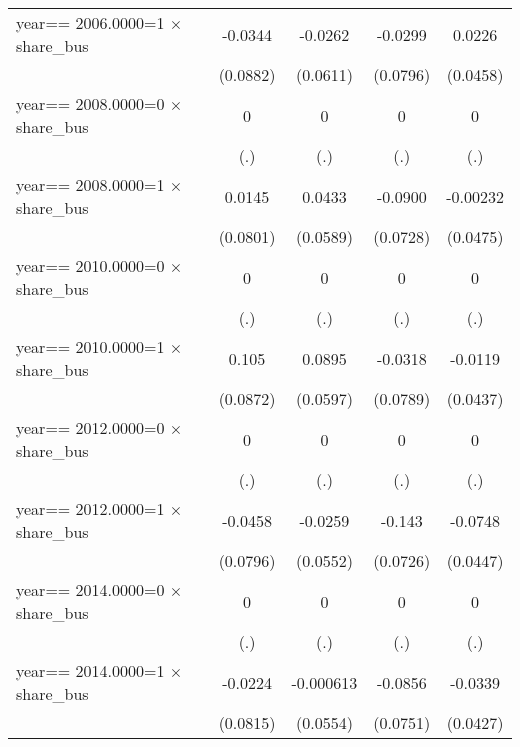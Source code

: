 \begin{table}[htbp]
\begin{tabular}{l*{4}{c}}
year==  2006.0000=1 $\times$ share\_bus&  -0.0344         &  -0.0262         &  -0.0299         &   0.0226         \\
                & (0.0882)         & (0.0611)         & (0.0796)         & (0.0458)         \\
year==  2008.0000=0 $\times$ share\_bus&        0         &        0         &        0         &        0         \\
                &      (.)         &      (.)         &      (.)         &      (.)         \\
year==  2008.0000=1 $\times$ share\_bus&   0.0145         &   0.0433         &  -0.0900         & -0.00232         \\
                & (0.0801)         & (0.0589)         & (0.0728)         & (0.0475)         \\
year==  2010.0000=0 $\times$ share\_bus&        0         &        0         &        0         &        0         \\
                &      (.)         &      (.)         &      (.)         &      (.)         \\
year==  2010.0000=1 $\times$ share\_bus&    0.105         &   0.0895         &  -0.0318         &  -0.0119         \\
                & (0.0872)         & (0.0597)         & (0.0789)         & (0.0437)         \\
year==  2012.0000=0 $\times$ share\_bus&        0         &        0         &        0         &        0         \\
                &      (.)         &      (.)         &      (.)         &      (.)         \\
year==  2012.0000=1 $\times$ share\_bus&  -0.0458         &  -0.0259         &   -0.143\sym{**} &  -0.0748\sym{*}  \\
                & (0.0796)         & (0.0552)         & (0.0726)         & (0.0447)         \\
year==  2014.0000=0 $\times$ share\_bus&        0         &        0         &        0         &        0         \\
                &      (.)         &      (.)         &      (.)         &      (.)         \\
year==  2014.0000=1 $\times$ share\_bus&  -0.0224         &-0.000613         &  -0.0856         &  -0.0339         \\
                & (0.0815)         & (0.0554)         & (0.0751)         & (0.0427)         \\

\end{tabular}
\end{table}
